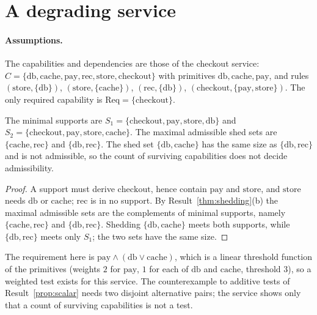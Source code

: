 \section{A degrading service}

\paragraph{Assumptions.} The capabilities and dependencies are those of the checkout service: $C=\{\mathrm{db},\mathrm{cache},\mathrm{pay},\mathrm{rec},\mathrm{store},\mathrm{checkout}\}$ with primitives $\mathrm{db},\mathrm{cache},\mathrm{pay}$, and rules $(\mathrm{store},\{\mathrm{db}\})$, $(\mathrm{store},\{\mathrm{cache}\})$, $(\mathrm{rec},\{\mathrm{db}\})$, $(\mathrm{checkout},\{\mathrm{pay},\mathrm{store}\})$. The only required capability is $\mathrm{Req}=\{\mathrm{checkout}\}$.

\begin{newresult}\label{prop:worked-service}
The minimal supports are $S_1=\{\mathrm{checkout},\mathrm{pay},\mathrm{store},\mathrm{db}\}$ and $S_2=\{\mathrm{checkout},\mathrm{pay},\mathrm{store},\mathrm{cache}\}$. The maximal admissible shed sets are $\{\mathrm{cache},\mathrm{rec}\}$ and $\{\mathrm{db},\mathrm{rec}\}$. The shed set $\{\mathrm{db},\mathrm{cache}\}$ has the same size as $\{\mathrm{db},\mathrm{rec}\}$ and is not admissible, so the count of surviving capabilities does not decide admissibility.
\end{newresult}
\begin{proof}
A support must derive $\mathrm{checkout}$, hence contain $\mathrm{pay}$ and $\mathrm{store}$, and $\mathrm{store}$ needs $\mathrm{db}$ or $\mathrm{cache}$; $\mathrm{rec}$ is in no support. By Result~\ref{thm:shedding}(b) the maximal admissible sets are the complements of minimal supports, namely $\{\mathrm{cache},\mathrm{rec}\}$ and $\{\mathrm{db},\mathrm{rec}\}$. Shedding $\{\mathrm{db},\mathrm{cache}\}$ meets both supports, while $\{\mathrm{db},\mathrm{rec}\}$ meets only $S_1$; the two sets have the same size.
\end{proof}

The requirement here is $\mathrm{pay}\wedge(\mathrm{db}\vee\mathrm{cache})$, which is a linear threshold function of the primitives (weights $2$ for $\mathrm{pay}$, $1$ for each of $\mathrm{db}$ and $\mathrm{cache}$, threshold $3$), so a weighted test exists for this service. The counterexample to additive tests of Result~\ref{prop:scalar} needs two disjoint alternative pairs; the service shows only that a count of surviving capabilities is not a test.

